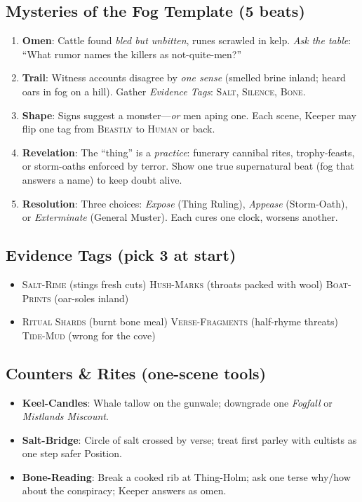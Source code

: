 \subsection*{Mysteries of the Fog Template (5 beats)}
\begin{enumerate}
  \item \textbf{Omen}: Cattle found \emph{bled but unbitten}, runes scrawled in kelp. \emph{Ask the table}: “What rumor names the killers as not-quite-men?”
  \item \textbf{Trail}: Witness accounts disagree by \emph{one sense} (smelled brine inland; heard oars in fog on a hill). Gather \emph{Evidence Tags}: \textsc{Salt}, \textsc{Silence}, \textsc{Bone}.
  \item \textbf{Shape}: Signs suggest a monster—\emph{or} men aping one. Each scene, Keeper may flip one tag from \textsc{Beastly} to \textsc{Human} or back.
  \item \textbf{Revelation}: The “thing” is a \emph{practice}: funerary cannibal rites, trophy-feasts, or storm-oaths enforced by terror. Show one true supernatural beat (fog that answers a name) to keep doubt alive.
  \item \textbf{Resolution}: Three choices: \emph{Expose} (Thing Ruling), \emph{Appease} (Storm-Oath), or \emph{Exterminate} (General Muster). Each cures one clock, worsens another.
\end{enumerate}

\subsection*{Evidence Tags (pick 3 at start)}
\begin{itemize}
  \item \textsc{Salt-Rime} (stings fresh cuts) \quad
  \textsc{Hush-Marks} (throats packed with wool) \quad
  \textsc{Boat-Prints} (oar-soles inland)
  \item \textsc{Ritual Shards} (burnt bone meal) \quad
  \textsc{Verse-Fragments} (half-rhyme threats) \quad
  \textsc{Tide-Mud} (wrong for the cove)
\end{itemize}

\subsection*{Counters \& Rites (one-scene tools)}
\begin{itemize}
  \item \textbf{Keel-Candles}: Whale tallow on the gunwale; downgrade one \emph{Fogfall} or \emph{Mistlands Miscount}.
  \item \textbf{Salt-Bridge}: Circle of salt crossed by verse; treat first parley with cultists as one step safer Position.
  \item \textbf{Bone-Reading}: Break a cooked rib at Thing-Holm; ask one terse why/how about the conspiracy; Keeper answers as omen.
\end{itemize}

